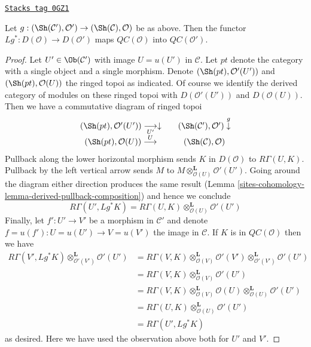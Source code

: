 \begin{lemma}
\label{sites-cohomology-lemma-cartesian-functorial}
\href{https://stacks.math.columbia.edu/tag/0GZ1}{\texttt{Stacks tag 0GZ1}}

Let $g : (\Sh(\mathcal{C}'), \mathcal{O}') \to (\Sh(\mathcal{C}), \mathcal{O})$
be as above. Then the functor $Lg^* : D(\mathcal{O}) \to D(\mathcal{O}')$
maps $\mathit{QC}(\mathcal{O})$ into $\mathit{QC}(\mathcal{O}')$.
\end{lemma}

\begin{proof}
Let $U' \in \Ob(\mathcal{C}')$ with image $U = u(U')$ in $\mathcal{C}$.
Let $pt$ denote the category with a single object and a single morphism.
Denote $(\Sh(pt), \mathcal{O}'(U'))$ and $(\Sh(pt), \mathcal{O}(U))$
the ringed topoi as indicated. Of course we identify the derived category
of modules on these ringed topoi with $D(\mathcal{O}'(U'))$ and
$D(\mathcal{O}(U))$. Then we have a commutative diagram of ringed topoi
$$
\begin{array}{ccc}(\Sh(pt), \mathcal{O}'(U')) \underset{U'}{\longrightarrow}\downarrow &  & (\Sh(\mathcal{C}'), \mathcal{O}') \overset{g}{\downarrow} \\ (\Sh(pt), \mathcal{O}(U)) \overset{U}{\longrightarrow} &  & (\Sh(\mathcal{C}), \mathcal{O})\end{array}
$$
Pullback along the lower horizontal morphism sends $K$ in $D(\mathcal{O})$
to $R\Gamma(U, K)$. Pullback by the left vertical arrow sends
$M$ to $M \otimes_{\mathcal{O}(U)}^\mathbf{L} \mathcal{O}'(U')$.
Going around the diagram either direction produces the same result
(Lemma \ref{sites-cohomology-lemma-derived-pullback-composition}) and hence we conclude
$$
R\Gamma(U', Lg^*K) =
R\Gamma(U, K) \otimes_{\mathcal{O}(U)}^\mathbf{L} \mathcal{O}'(U')
$$
Finally, let $f' : U' \to V'$ be a morphism in $\mathcal{C}'$ and
denote $f = u(f') : U = u(U') \to V = u(V')$ the image in $\mathcal{C}$.
If $K$ is in $\mathit{QC}(\mathcal{O})$ then we have
\begin{align*}
R\Gamma(V', Lg^*K) \otimes_{\mathcal{O}'(V')}^\mathbf{L} \mathcal{O}'(U')
& =
R\Gamma(V, K) \otimes_{\mathcal{O}(V)}^\mathbf{L} \mathcal{O}'(V')
\otimes_{\mathcal{O}'(V')}^\mathbf{L} \mathcal{O}'(U') \\
& =
R\Gamma(V, K) \otimes_{\mathcal{O}(V)}^\mathbf{L} \mathcal{O}'(U') \\
& =
R\Gamma(V, K) \otimes_{\mathcal{O}(V)}^\mathbf{L} \mathcal{O}(U)
\otimes_{\mathcal{O}(U)}^\mathbf{L} \mathcal{O}'(U') \\
& =
R\Gamma(U, K) \otimes_{\mathcal{O}(U)}^\mathbf{L} \mathcal{O}'(U') \\
& =
R\Gamma(U', Lg^*K)
\end{align*}
as desired. Here we have used the observation above both for $U'$ and $V'$.
\end{proof}

